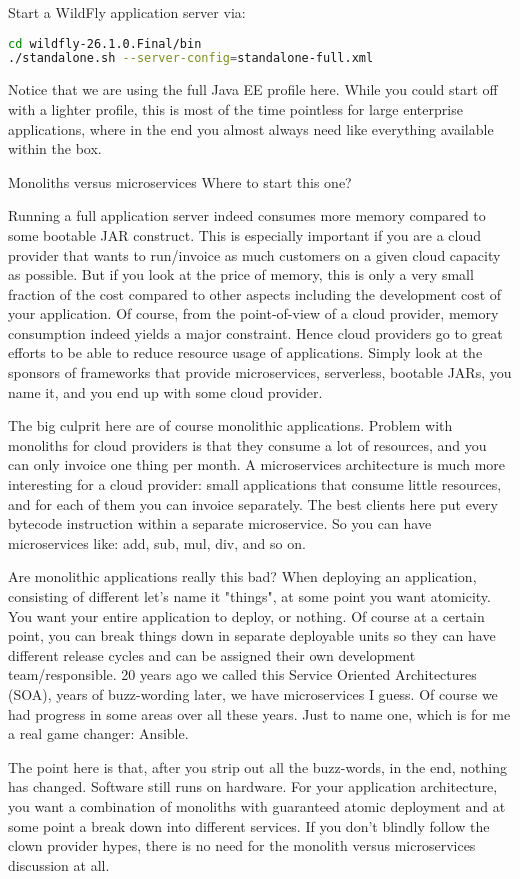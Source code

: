 Start a WildFly \cite{WildFly} application server via:
\begin{lstlisting}[language=bash]
cd wildfly-26.1.0.Final/bin
./standalone.sh --server-config=standalone-full.xml
\end{lstlisting}
Notice that we are using the full Java EE profile here.
While you could start off with a lighter profile, this is most of the time pointless for large enterprise applications, where in the end you almost always need like everything available within the box.
\begin{ClownComputing}{Monoliths versus microservices}
	Where to start this one?
	
	Running a full application server indeed consumes more memory compared to some bootable JAR construct.
	This is especially important if you are a cloud provider that wants to run/invoice as much customers on a given cloud capacity as possible.
	But if you look at the price of memory, this is only a very small fraction of the cost compared to other aspects including the development cost of your application.
	Of course, from the point-of-view of a cloud provider, memory consumption indeed yields a major constraint.
	Hence cloud providers go to great efforts to be able to reduce resource usage of applications.
	Simply look at the sponsors of frameworks that provide microservices, serverless, bootable JARs, you name it,
	and you end up with some cloud provider.
	
	The big culprit here are of course monolithic applications.
	Problem with monoliths for cloud providers is that they consume a lot of resources, and you can only invoice one thing per month.
	A microservices architecture is much more interesting for a cloud provider: small applications that consume little resources,
	and for each of them you can invoice separately.
	The best clients here put every bytecode instruction within a separate microservice.
	So you can have microservices like: add, sub, mul, div, and so on.
	
	Are monolithic applications really this bad?
	When deploying an application, consisting of different let's name it "things", at some point you want atomicity.
	You want your entire application to deploy, or nothing.
	Of course at a certain point, you can break things down in separate deployable units so they can have different release cycles and can be assigned their own development team/responsible.
	20 years ago we called this Service Oriented Architectures (SOA), years of buzz-wording later, we have microservices I guess.
	Of course we had progress in some areas over all these years. Just to name one, which is for me a real game changer: Ansible.
	
	The point here is that, after you strip out all the buzz-words, in the end, nothing has changed. Software still runs on hardware.
	For your application architecture, you want a combination of monoliths with guaranteed atomic deployment and at some point a break down into different services.
	If you don't blindly follow the clown provider hypes, there is no need for the monolith versus microservices discussion at all.
\end{ClownComputing}

